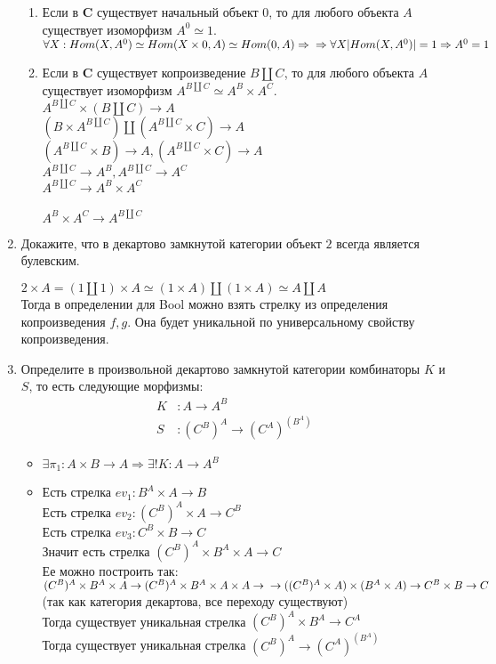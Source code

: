 \documentclass[draft]{article}
\newcommand{\cat}[1]{\mathbf{#1}}
\renewcommand{\C}{\cat{C}}
\begin{document}
\begin{enumerate}
\begin{enumerate}
\item Если в $\C$ существует начальный объект 0, то для любого объекта $A$ существует изоморфизм $A^0 \simeq 1$.\\
$\forall X: Hom(X, A^0) \simeq Hom(X \times 0, A)\simeq Hom(0, A) \Rightarrow \\\Rightarrow \forall X |Hom(X, A^0)| = 1\Rightarrow A^0 = 1$
\item Если в $\C$ существует копроизведение $B \amalg C$, то для любого объекта $A$ существует изоморфизм $A^{B \amalg C} \simeq A^B \times A^C$.\\
$A^{B \amalg C}\times (B \amalg C) \to A $\\
$(B \times A^{B \amalg C})\amalg( A^{B \amalg C} \times C) \to A $\\
$(A^{B \amalg C} \times B) \to A, ( A^{B \amalg C} \times C) \to A $\\
$A^{B \amalg C} \to A^B, A^{B \amalg C} \to A^C $\\
$A^{B \amalg C} \to A^B \times A^C $\\
\\
$A^B\times A^C \to A^{B\amalg C}$\\
\end{enumerate}


\item Докажите, что в декартово замкнутой категории объект $2$ всегда является булевским.

$2 \times A = (1 \amalg 1)\times A \simeq
(1 \times A)\amalg (1 \times A) \simeq A\amalg A$\\
Тогда в определении для Bool можно взять стрелку из определения копроизведения $f, g$. Она будет уникальной по универсальному свойству копроизведения.

\item Определите в произвольной декартово замкнутой категории комбинаторы $K$ и $S$, то есть следующие морфизмы:
\begin{align*}
K & : A \to A^B \\ 
S & : (C^B)^A \to (C^A)^{(B^A)}
\end{align*}
\begin{itemize}
\item
$ \exists \pi_1 : A \times B \to A \Rightarrow \exists! K : A \to A^B $
\item
Есть стрелка $ev_1: B^A\times A \to B$\\
Есть стрелка $ev_2: (C^B)^A \times A \to C^B$\\
Есть стрелка $ev_3: C^B \times B \to C$\\
Значит есть стрелка $(C^B)^A \times B^A \times A \to C$\\
Ее можно построить так: $(C^B)^A \times B^A \times A \to (C^B)^A \times B^A \times A\times A \to\\
\to ((C^B)^A\times A) \times (B^A \times A) \to C^B \times B \to C$\\
(так как категория декартова, все переходу существуют)\\
Тогда существует уникальная стрелка $(C^B)^A \times B^A \to C^A$\\
Тогда существует уникальная стрелка $(C^B)^A \to (C^A)^{(B^A )}$
\end{itemize}


\end{enumerate}
\end{document}
